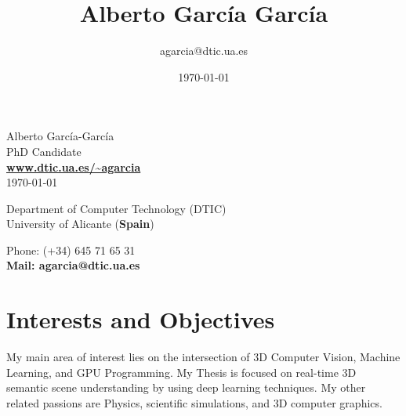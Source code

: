 \documentclass[8pt]{article}
\title{\bfseries\Huge Alberto García García}
\author{agarcia@dtic.ua.es}
\date{\today}
\begin{document}
\begin{center}
	\Huge Alberto García-García\\
	\Large PhD Candidate\\
	\Large \textbf{\url{www.dtic.ua.es/~agarcia}}\\
	\today
\end{center}
\bigskip
\begin{minipage}[ht]{0.65\textwidth}
Department of Computer Technology (DTIC)\\
University of Alicante (\textbf{Spain})\\
\end{minipage}
\hfill
\begin{minipage}[ht]{0.3\textwidth}
Phone: (+34) 645 71 65 31\\
\textbf{Mail: agarcia@dtic.ua.es}\\
\end{minipage}
 
\section*{Interests and Objectives}

My main area of interest lies on the intersection of 3D Computer Vision, Machine Learning, and GPU Programming. My Thesis is focused on real-time 3D semantic scene understanding by using deep learning techniques. My other related passions are Physics, scientific simulations, and 3D computer graphics.
 
\end{document}
